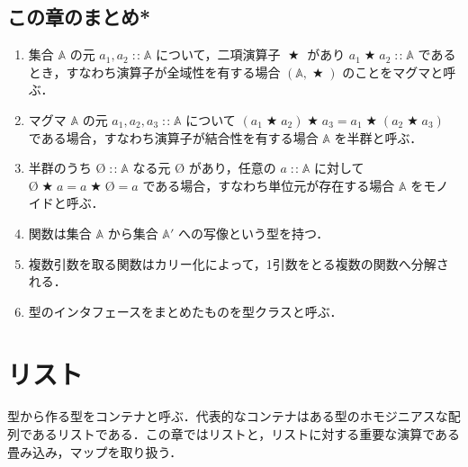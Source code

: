 \documentclass[a5paper,twoside,fleqn,draft]{jsbook}
\newcommand{\programminglanguage}[1]{\textsf{#1}}
\newcommand{\haskell}{\programminglanguage{Haskell}}
\newenvironment{leader}{\begingroup\gt}{\endgroup}
\newcommand{\code}[1]{\texttt{#1}}
\newcommand{\mZero}{\text{\O}}
\DeclareMathOperator{\mBinOp}{\bigstar}
\DeclareMathOperator{\mIn}{{:\!:}}
\DeclareMathOperator{\mPlus}{\bf{+}} %
\newcommand{\mSpecialSet}[1]{\mathbb{#1}}
\newcommand{\mASet}{\mSpecialSet{A}}
\newcommand{\mType}[1]{\mathbf{#1}} %
\newcommand{\mA}{\mType{a}}
\newcommand{\mTupleWith}[1]{\left(#1\right)}
\newcommand{\mTypeClass}[1]{\textbf{\textit{#1}}}
\newcommand{\mMonoidTypeClass}{\mTypeClass{Monoid}}
\begin{document}

\section{この章のまとめ*}

\begin{enumerate}
\item 集合 $\mASet$ の元 $a_1,a_2\mIn\mASet$ について，二項演算子 $\mBinOp$ があり $a_1\mBinOp a_2\mIn\mASet$ であるとき，すなわち演算子が全域性を有する場合 $(\mASet,\mBinOp)$ のことをマグマと呼ぶ．
\item マグマ $\mASet$ の元 $a_1,a_2,a_3\mIn\mASet$ について $(a_1\mBinOp a_2)\mBinOp a_3=a_1\mBinOp(a_2\mBinOp a_3)$ である場合，すなわち演算子が結合性を有する場合 $\mASet$ を半群と呼ぶ．
\item 半群のうち $\mZero\mIn\mASet$ なる元 $\mZero$ があり，任意の $a\mIn\mASet$ に対して $\mZero\mBinOp a=a\mBinOp\mZero=a$ である場合，すなわち単位元が存在する場合 $\mASet$ をモノイドと呼ぶ．
\item 関数は集合 $\mASet$ から集合 $\mASet'$ への写像という型を持つ．
\item 複数引数を取る関数はカリー化によって，1引数をとる複数の関数へ分解される．
\item 型のインタフェースをまとめたものを型クラスと呼ぶ．
\end{enumerate}

\chapter{リスト}
\label{ch:list}

\begin{leader}
型から作る型をコンテナと呼ぶ．代表的なコンテナはある型のホモジニアスな配列であるリストである．この章ではリストと，リストに対する重要な演算である畳み込み，マップを取り扱う．
\end{leader}
\end{document}
